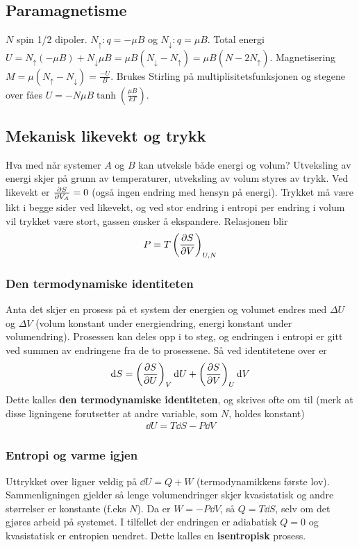 \documentclass[12pt]{article}
\begin{document}
\subsection{Paramagnetisme}
$N$ spin 1/2 dipoler. $N_\uparrow: q = -\mu B$ og $N_\downarrow: q = \mu B$.
Total energi $U = N_\uparrow(-\mu B) + N_\downarrow \mu B = \mu B(N_\downarrow - N_\uparrow) = \mu B(N - 2N_\uparrow)$.
Magnetisering $M = \mu(N_\uparrow - N_\downarrow) = \frac{-U}{B}$. Brukes Stirling
på multiplisitetsfunksjonen og stegene over fåes $U = -N\mu B\tanh{\left(\frac{\mu B}{kT} \right)}$.
\subsection{Mekanisk likevekt og trykk}
Hva med når systemer $A$ og $B$ kan utveksle både energi og volum? Utveksling av
energi skjer på grunn av temperaturer, utveksling av volum styres av trykk.
Ved likevekt er $\pdv{S}{V_A} = 0$ (også ingen endring med hensyn på energi). Trykket
må være likt i begge sider ved likevekt, og ved stor endring i entropi per endring i
volum vil trykket være stort, gassen ønsker å ekspandere. Relasjonen blir
\begin{align*}
  P = T \left( \pdv{S}{V} \right)_{U,N}
\end{align*}
\subsubsection{Den termodynamiske identiteten}
Anta det skjer en prosess på et system der energien og volumet endres med $\Delta U$
og $\Delta V$ (volum konstant under energiendring, energi konstant under volumendring).
Prosessen kan deles opp i to steg, og endringen i entropi er gitt ved summen av
endringene fra de to prosessene. Så ved identitetene over er
\begin{align*}
  \dd S = \left( \pdv{S}{U} \right)_{V} \dd U + \left( \pdv{S}{V} \right)_{U}\dd V
\end{align*}
Dette kalles \textbf{den termodynamiske identiteten}, og skrives ofte om til (merk
at disse ligningene forutsetter at andre variable, som $N$, holdes konstant)
\begin{align*}
  \dd U = T \dd S - P \dd V
\end{align*}
\subsubsection{Entropi og varme igjen}
Uttrykket over ligner veldig på $\dd U = Q + W$ (termodynamikkens første lov).
Sammenligningen gjelder så lenge volumendringer skjer kvasistatisk og andre
størrelser er konstante (f.eks $N$). Da er $W = -P \dd V$, så $Q = T \dd S$,
selv om det gjøres arbeid på systemet. I tilfellet der endringen er adiabatisk $Q = 0$
og kvasistatisk er entropien uendret. Dette kalles en \textbf{isentropisk} prosess.
\end{document}
